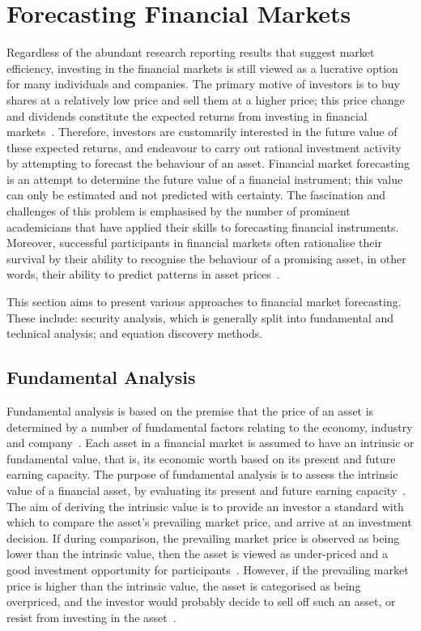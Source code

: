 \documentclass[13pt]{report}
\begin{document}
\section{Forecasting Financial Markets}
Regardless of the abundant research reporting results that suggest market efficiency, investing in the financial markets is still viewed as a lucrative option for many individuals and companies. The primary motive of  investors is to buy shares at a relatively low price and sell them at a higher price; this price change and dividends constitute the expected returns from investing in financial markets~\cite{kevin2015security}. Therefore, investors are customarily interested in the future value of these expected returns, and endeavour to carry out rational investment activity by attempting to forecast the behaviour of an asset. Financial market forecasting is an attempt to determine the future value of a financial instrument; this value can only be estimated and not predicted with certainty. The fascination and challenges of this problem is emphasised by the number of prominent academicians that have applied their skills to forecasting financial instruments. Moreover, successful participants in financial markets often rationalise their survival by their ability to recognise the behaviour of a promising asset, in other words, their ability to predict patterns in asset prices~\cite{bailey2005economics}.\par 

This section aims to present various approaches to financial market forecasting. These include: security analysis, which is generally split into fundamental and technical analysis; and equation discovery methods.

\subsection{Fundamental Analysis}
Fundamental analysis is based on the premise that the price of an asset is determined by a number of fundamental factors relating to the economy, industry and company~\cite{kevin2015security}. Each asset in a financial market is assumed to have an intrinsic or fundamental value, that is, its economic worth based on its present and future earning capacity. The purpose of fundamental analysis is to assess the intrinsic value of a financial asset, by evaluating its present and future earning capacity~\cite{kevin2015security}. The aim of deriving the intrinsic value is to provide an investor a standard with which to compare the asset's prevailing market price, and arrive at an investment decision. If during comparison, the prevailing market price is observed as being lower than the intrinsic value, then the asset is viewed as under-priced and a good investment opportunity for participants~\cite{kevin2015security}. However, if the prevailing market price is higher than the intrinsic value, the asset is categorised as being overpriced, and the investor would probably decide to sell off such an asset, or resist from investing in the asset~\cite{kevin2015security}. 
\end{document}
